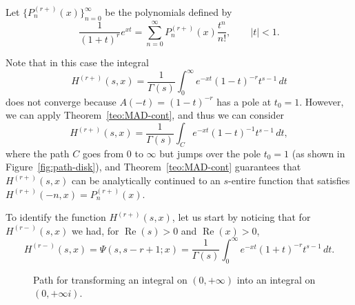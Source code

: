 \documentclass[11pt,a4paper]{amsart}
\renewcommand{\Re}{\operatorname{Re}}
\theoremstyle{plain}
\theoremstyle{plain}
\theoremstyle{remark}
\numberwithin{equation}{section}
\begin{document}
Let $\{P_n^{(r+)}(x)\}_{n=0}^{\infty}$ be the polynomials defined by
\begin{equation*}
\frac{1}{(1+t)^r} e^{xt} = \sum_{n=0}^{\infty} P_n^{(r+)}(x) \frac{t^n}{n!},
\qquad |t| < 1.
\end{equation*}

Note that in this case the integral
\begin{equation*}
H^{(r+)}(s,x) = \frac{1}{\Gamma(s)}\int_{0}^{\infty} e^{-xt}(1-t)^{-r} t^{s-1} \,dt
\end{equation*}
does not converge because $A(-t) = (1-t)^{-r}$ has a pole at $t_0=1$. 
However, we can apply Theorem~\ref{teo:MAD-cont}, and thus we can consider
\begin{equation*}
H^{(r+)}(s,x) = \frac{1}{\Gamma(s)}\int_{C} e^{-xt}(1-t)^{-1} t^{s-1} \,dt,
\end{equation*}
where the path $C$ goes from $0$ to $\infty$ but jumps over the pole $t_0=1$ (as shown in Figure~\ref{fig:path-disk}), and Theorem~\ref{teo:MAD-cont} guarantees that $H^{(r+)}(s,x)$ can be analytically continued to an $s$-entire function that satisfies $H^{(r+)}(-n,x) = P_n^{(r+)}(x)$. 

To identify the function $H^{(r+)}(s,x)$, let us start by noticing that for $H^{(r-)}(s,x)$ we had, for $\Re(s) > 0$ and $\Re(x) > 0$,
\begin{equation*}
  H^{(r-)}(s,x) = \Psi(s,s-r+1;x) = \frac{1}{\Gamma(s)} \int_0^{\infty }e^{-xt}(1+t)^{-r} t^{s-1}\,dt.
\end{equation*}

\begin{figure}
\caption{Path for transforming an integral on $(0,+\infty)$ into an integral on $(0,+\infty i)$.}
\label{fig:path-analytic-cont}
\end{figure}
\end{document}
